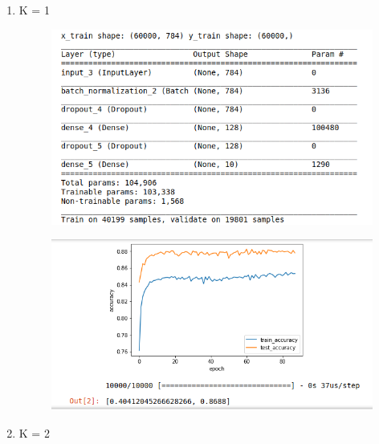 \documentclass{article}
\begin{document}
\begin{enumerate}
    \item  K = 1
        \begin{figure}[!ht]
            \begin{center}
                \includegraphics[width=1.0\textwidth]{1a.png}
            \end{center}
        \end{figure}
        \begin{figure}[!ht]
            \begin{center}
                \includegraphics[width=1.0\textwidth]{1b.png}
            \end{center}
        \end{figure}
        \clearpage
    \item  K = 2
        \begin{figure}[!ht]
            \begin{center}

\end{center}
\end{figure}
\end{enumerate}
\end{document}
